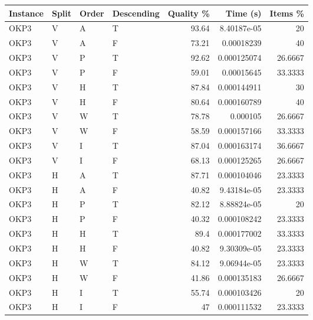 \begin{tabular}{llllrrr}
    \hline
    Instance & Split & Order & Descending & Quality \% & Time (s)    & Items \% \\
    \hline
    OKP3     & V     & A     & T          & 93.64      & 8.40187e-05 & 20       \\
    OKP3     & V     & A     & F          & 73.21      & 0.00018239  & 40       \\
    OKP3     & V     & P     & T          & 92.62      & 0.000125074 & 26.6667  \\
    OKP3     & V     & P     & F          & 59.01      & 0.00015645  & 33.3333  \\
    OKP3     & V     & H     & T          & 87.84      & 0.000144911 & 30       \\
    OKP3     & V     & H     & F          & 80.64      & 0.000160789 & 40       \\
    OKP3     & V     & W     & T          & 78.78      & 0.000105    & 26.6667  \\
    OKP3     & V     & W     & F          & 58.59      & 0.000157166 & 33.3333  \\
    OKP3     & V     & I     & T          & 87.04      & 0.000163174 & 36.6667  \\
    OKP3     & V     & I     & F          & 68.13      & 0.000125265 & 26.6667  \\
    OKP3     & H     & A     & T          & 87.71      & 0.000104046 & 23.3333  \\
    OKP3     & H     & A     & F          & 40.82      & 9.43184e-05 & 23.3333  \\
    OKP3     & H     & P     & T          & 82.12      & 8.88824e-05 & 20       \\
    OKP3     & H     & P     & F          & 40.32      & 0.000108242 & 23.3333  \\
    OKP3     & H     & H     & T          & 89.4       & 0.000177002 & 33.3333  \\
    OKP3     & H     & H     & F          & 40.82      & 9.30309e-05 & 23.3333  \\
    OKP3     & H     & W     & T          & 84.12      & 9.06944e-05 & 23.3333  \\
    OKP3     & H     & W     & F          & 41.86      & 0.000135183 & 26.6667  \\
    OKP3     & H     & I     & T          & 55.74      & 0.000103426 & 20       \\
    OKP3     & H     & I     & F          & 47         & 0.000111532 & 23.3333  \\

\end{tabular}
